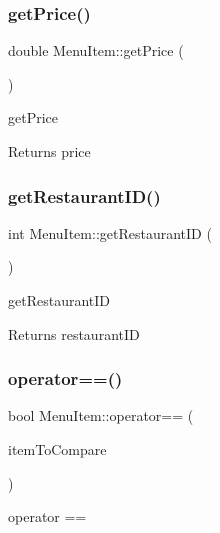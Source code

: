 \subsubsection{\texorpdfstring{get\+Price()}{getPrice()}}
{\footnotesize\ttfamily double Menu\+Item\+::get\+Price (\begin{DoxyParamCaption}{ }\end{DoxyParamCaption})}



get\+Price 

\begin{DoxyReturn}{Returns}
price 
\end{DoxyReturn}
\mbox{\label{class_menu_item_acb28f30d43a514d5f4e9598b5c6f3f60}} 
\subsubsection{\texorpdfstring{get\+Restaurant\+I\+D()}{getRestaurantID()}}
{\footnotesize\ttfamily int Menu\+Item\+::get\+Restaurant\+ID (\begin{DoxyParamCaption}{ }\end{DoxyParamCaption})}



get\+Restaurant\+ID 

\begin{DoxyReturn}{Returns}
restaurant\+ID 
\end{DoxyReturn}
\mbox{\label{class_menu_item_a32972e702a424fc12cf96c561dbc5698}} 
\subsubsection{\texorpdfstring{operator==()}{operator==()}}
{\footnotesize\ttfamily bool Menu\+Item\+::operator== (\begin{DoxyParamCaption}\item[{\hyperlink{class_menu_item}{Menu\+Item}}]{item\+To\+Compare }\end{DoxyParamCaption})\hspace{0.3cm}{\ttfamily [inline]}}



operator == 


